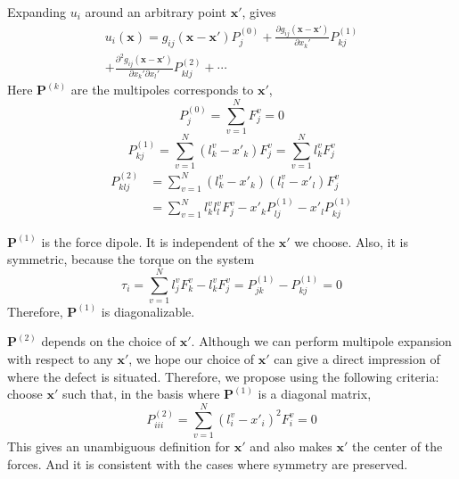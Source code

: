 \documentclass[%
 reprint,
 amsmath,amssymb,
 aps,
]{revtex4-1}
\begin{document}
Expanding $u_i$ around an arbitrary point $\bm{x'}$, gives
\begin{multline}
u_i(\bm{x})
= g_{ij}(\bm{x}-\bm{x'}) P_j^{(0)}
 + \frac{\partial g_{ij}(\bm{x}-\bm{x'})}{\partial x_k'} P_{kj}^{(1)}\\
 + \frac{\partial^2 g_{ij}(\bm{x}-\bm{x'})}{\partial x_k' \partial x_l'} P_{klj}^{(2)}
 + \cdots
\end{multline}
Here $\bm{P}^{(k)}$ are the multipoles corresponds to $\bm{x'}$,
\begin{equation}
  P_j^{(0)} = \sum_{v=1}^N F_j^v = 0
\end{equation}
\begin{equation}
  P_{kj}^{(1)} = \sum_{v=1}^N (l_k^v-x'_k) F_j^v = \sum_{v=1}^N l_k^v F_j^v
\end{equation}
\begin{align}
  P_{klj}^{(2)} & = \sum_{v=1}^N (l_k^v-x'_k) (l_l^v-x'_l) F_j^v \nonumber \\
  & = \sum_{v=1}^N l_k^vl_l^v F_j^v - x'_k P_{lj}^{(1)} - x'_l P_{kj}^{(1)}
\end{align}

$\bm{P}^{(1)}$ is the force dipole.
It is independent of the $\bm{x'}$ we choose.
Also, it is symmetric, because the torque on the system
\begin{equation}
  \tau_i = \sum_{v=1}^N l_j^v F_k^v - l_k^v F_j^v = P_{jk}^{(1)} - P_{kj}^{(1)} = 0
\end{equation}
Therefore, $\bm{P}^{(1)}$ is diagonalizable.

$\bm{P}^{(2)}$ depends on the choice of $\bm{x'}$.
Although we can perform multipole expansion with respect to any $\bm{x'}$, we hope our choice of $\bm{x'}$ can give a direct impression of where the defect is situated.
Therefore, we propose using the following criteria:
choose $\bm{x'}$ such that, in the basis where $\bm{P}^{(1)}$ is a diagonal matrix,
\begin{equation}
  P_{iii}^{(2)} = \sum_{v=1}^N (l_i^v-x'_i)^2 F_i^v = 0
\end{equation}
This gives an unambiguous definition for $\bm{x'}$ and also makes $\bm{x'}$ the center of the forces.
And it is consistent with the cases where symmetry are preserved.

%
\end{document}
